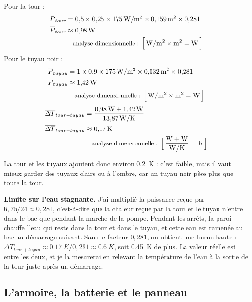 \begin{demonstration}
Pour la tour :
\begin{align*}
\overline{P}_{tour} &= 0{,}5 \times 0{,}25 \times \qty{175}{W/m^2} \times \qty{0,159}{m^2} \times 0{,}281\\
\overline{P}_{tour} &\approx \qty{0,98}{W}\\
\dimline{\unit{W/m^2}\times\unit{m^2}=\unit{W}}
\end{align*}
Pour le tuyau noir :
\begin{align*}
\overline{P}_{tuyau} &= 1 \times 0{,}9 \times \qty{175}{W/m^2} \times \qty{0,032}{m^2} \times 0{,}281\\
\overline{P}_{tuyau} &\approx \qty{1,42}{W}\\
\dimline{\unit{W/m^2}\times\unit{m^2}=\unit{W}}
\end{align*}
\begin{align*}
\overline{\Delta T}_{tour+tuyau} &= \frac{\qty{0,98}{W} + \qty{1,42}{W}}{\qty{13,87}{W/K}}\\
\overline{\Delta T}_{tour+tuyau} &\approx \qty{0,17}{K}\\
\dimline{\dfrac{\unit{W}+\unit{W}}{\unit{W/K}}=\unit{K}}
\end{align*}
\end{demonstration}

La tour et les tuyaux ajoutent donc environ \qty{0,2}{K} : c'est faible, mais il vaut mieux garder des tuyaux clairs ou à l'ombre, car un tuyau noir pèse plus que toute la tour.

\textbf{Limite sur l'eau stagnante.} J'ai multiplié la puissance reçue par $6,75/24 \approx 0,281$, c'est-à-dire que la chaleur reçue par la tour et le tuyau n'entre dans le bac que pendant la marche de la pompe. Pendant les arrêts, la paroi chauffe l'eau qui reste dans la tour et dans le tuyau, et cette eau est ramenée au bac au démarrage suivant. Sans le facteur $0,281$, on obtient une borne haute : $\overline{\Delta T}_{tour+tuyau} \approx \qty{0,17}{K}/0{,}281 \approx \qty{0,6}{K}$, soit \qty{0,45}{K} de plus. La valeur réelle est entre les deux, et je la mesurerai en relevant la température de l'eau à la sortie de la tour juste après un démarrage.

\subsection{L'armoire, la batterie et le panneau}

